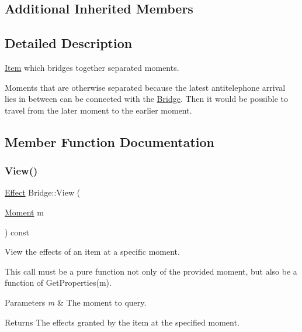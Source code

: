 \subsection*{Additional Inherited Members}


\subsection{Detailed Description}
\hyperlink{classitem_1_1_item}{Item} which bridges together separated moments. 

Moments that are otherwise separated because the latest antitelephone arrival lies in between can be connected with the \hyperlink{classitem_1_1_bridge}{Bridge}. Then it would be possible to travel from the later moment to the earlier moment. 

\subsection{Member Function Documentation}
\mbox{\label{classitem_1_1_bridge_a644ccbcba577629cd0f07066e64afac1}} 
\subsubsection{\texorpdfstring{View()}{View()}}
{\footnotesize\ttfamily \hyperlink{classitem_1_1_effect}{Effect} Bridge\+::\+View (\begin{DoxyParamCaption}\item[{\hyperlink{classtimeplane_1_1_moment}{Moment}}]{m }\end{DoxyParamCaption}) const\hspace{0.3cm}{\ttfamily [virtual]}}



View the effects of an item at a specific moment. 

This call must be a pure function not only of the provided moment, but also be a function of {\ttfamily Get\+Properties(m)}. 
\begin{DoxyParams}{Parameters}
{\em m} & The moment to query. \\
\hline
\end{DoxyParams}
\begin{DoxyReturn}{Returns}
The effects granted by the item at the specified moment. 
\end{DoxyReturn}

